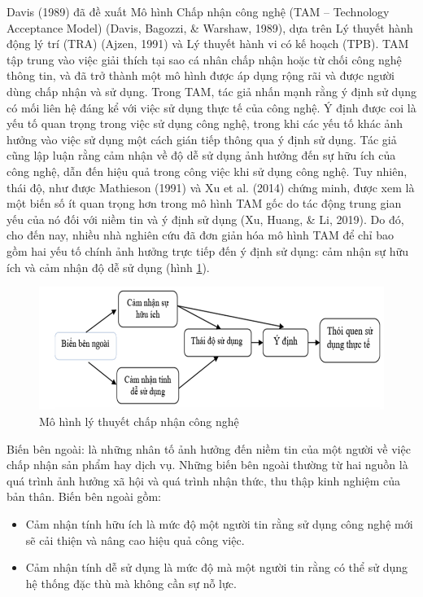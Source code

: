 		Davis (1989) đã đề xuất Mô hình Chấp nhận công nghệ (TAM – Technology Acceptance Model) (Davis, Bagozzi, \& Warshaw, 1989), dựa trên Lý thuyết hành động lý trí (TRA) (Ajzen, 1991) và Lý thuyết hành vi có kế hoạch (TPB). TAM tập trung vào việc giải thích tại sao cá nhân chấp nhận hoặc từ chối công nghệ thông tin, và đã trở thành một mô hình được áp dụng rộng rãi và được người dùng chấp nhận và sử dụng. Trong TAM, tác giả nhấn mạnh rằng ý định sử dụng có mối liên hệ đáng kể với việc sử dụng thực tế của công nghệ. Ý định được coi là yếu tố quan trọng trong việc sử dụng công nghệ, trong khi các yếu tố khác ảnh hưởng vào việc sử dụng một cách gián tiếp thông qua ý định sử dụng. Tác giả cũng lập luận rằng cảm nhận về độ dễ sử dụng ảnh hưởng đến sự hữu ích của công nghệ, dẫn đến hiệu quả trong công việc khi sử dụng công nghệ. Tuy nhiên, thái độ, như được Mathieson (1991) và Xu et al. (2014) chứng minh, được xem là một biến số ít quan trọng hơn trong mô hình TAM gốc do tác động trung gian yếu của nó đối với niềm tin và ý định sử dụng (Xu, Huang, \& Li, 2019). Do đó, cho đến nay, nhiều nhà nghiên cứu đã đơn giản hóa mô hình TAM để chỉ bao gồm hai yếu tố chính ảnh hưởng trực tiếp đến ý định sử dụng: cảm nhận sự hữu ích và cảm nhận độ dễ sử dụng (hình \ref{mo_hinh_ly_thuyet_chap_nhan_cong_nghe}).
		
		\begin{figure}[H]
			\includegraphics[width=\linewidth]{picture/mo_hinh_ly_thuyet_chap_nhan_cong_nghe.png}
			\caption{Mô hình lý thuyết chấp nhận công nghệ}
			\label{mo_hinh_ly_thuyet_chap_nhan_cong_nghe}
		\end{figure}
		
		Biến bên ngoài: là những nhân tố ảnh hưởng đến niềm tin của một người về việc chấp nhận sản phẩm hay dịch vụ. Những biến bên ngoài thường từ hai nguồn là quá trình ảnh hưởng xã hội và quá trình nhận thức, thu thập kinh nghiệm của bản thân. Biến bên ngoài gồm:
		\begin{itemize}[label=+]
		\item Cảm nhận tính hữu ích là mức độ một người tin rằng sử dụng công nghệ mới sẽ cải thiện và nâng cao hiệu quả công việc. 
		\item Cảm nhận tính dễ sử dụng là mức độ mà một người tin rằng có thể sử dụng hệ thống đặc thù mà không cần sự nỗ lực.
		\end{itemize}	
		
